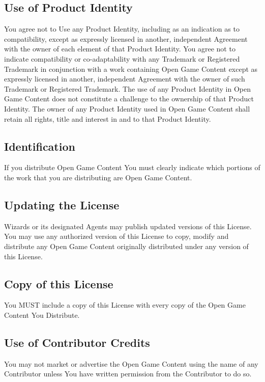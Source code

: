 \subsection{Use of Product Identity}

You agree not to Use any Product Identity, including 
as an indication as to compatibility, except as expressly licensed in another, 
independent Agreement with the owner of each element of that Product Identity. 
You agree not to indicate compatibility or co-adaptability with any Trademark or 
Registered Trademark in conjunction with a work containing Open Game Content except 
as expressly licensed in another, independent Agreement with the owner of such 
Trademark or Registered Trademark. The use of any Product Identity in Open Game 
Content does not constitute a challenge to the ownership of that Product Identity. 
The owner of any Product Identity used in Open Game Content shall retain all rights, 
title and interest in and to that Product Identity. 


\subsection{Identification}

If you distribute Open Game Content You must clearly indicate 
which portions of the work that you are distributing are Open Game Content. 


\subsection{Updating the License}

Wizards or its designated Agents may publish updated versions 
of this License. You may use any authorized version of this License to copy, modify 
and distribute any Open Game Content originally distributed under any version of 
this License. 


\subsection{Copy of this License}

You MUST include a copy of this License with every copy 
of the Open Game Content You Distribute. 


\subsection{Use of Contributor Credits}

You may not market or advertise the Open Game Content 
using the name of any Contributor unless You have written permission from the Contributor 
to do so. 


